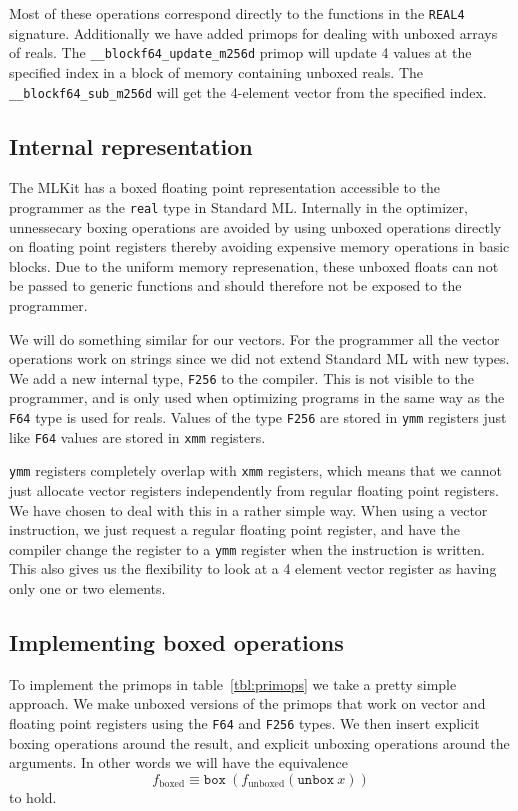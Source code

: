 \documentclass{article}
\begin{document}
Most of these operations correspond directly to the functions in the \texttt{REAL4} signature. Additionally we have added primops for dealing with unboxed arrays of reals. The \verb!__blockf64_update_m256d! primop will update 4 values at the specified index in a block of memory containing unboxed reals. The \verb!__blockf64_sub_m256d! will get the 4-element vector from the specified index.

    
\subsection{Internal representation}

The MLKit has a boxed floating point representation accessible to the programmer as the \verb!real! type in Standard ML. Internally in the optimizer, unnessecary boxing operations are avoided by using unboxed operations directly on floating point registers thereby avoiding expensive memory operations in basic blocks. Due to the uniform memory represenation, these unboxed floats can not be passed to generic functions and should therefore not be exposed to the programmer.

We will do something similar for our vectors. For the programmer all the vector operations work on strings since we did not extend Standard ML with new types. We add a new internal type, \texttt{F256} to the compiler. This is not visible to the programmer, and is only used when optimizing programs in the same way as the \texttt{F64} type is used for reals. Values of the type \texttt{F256} are stored in \texttt{ymm} registers just like \texttt{F64} values are stored in \texttt{xmm} registers.

\texttt{ymm} registers completely overlap with \texttt{xmm} registers, which means that we cannot just allocate vector registers independently from regular floating point registers. We have chosen to deal with this in a rather simple way. When using a vector instruction, we just request a regular floating point register, and have the compiler change the register to a \texttt{ymm} register when the instruction is written. This also gives us the flexibility to look at a 4 element vector register as having only one or two elements.

\subsection{Implementing boxed operations}

To implement the primops in table~\ref{tbl:primops} we take a pretty simple approach. We make unboxed versions of the primops that work on vector and floating point registers using the \texttt{F64} and \texttt{F256} types. We then insert explicit boxing operations around the result, and explicit unboxing operations around the arguments. In other words we will have the equivalence
\[
    f_{\mathrm{boxed}} \equiv \mathtt{box}\ (f_{\mathrm{unboxed}} (\mathtt{unbox}\ x))
\]
to hold.
\end{document}
